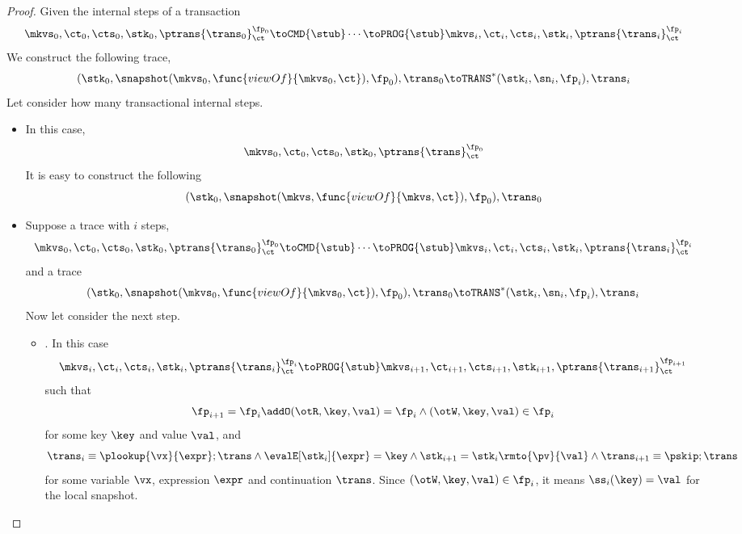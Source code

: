 \begin{proof}
    Given the internal steps of a transaction
    \[
        \mkvs_0, \ct_0, \cts_0, \stk_0, \ptrans{\trans_0}_\ct^{\fp_0} \toCMD{\stub} 
        \cdots  \toPROG{\stub} \mkvs_i, \ct_i, \cts_i, \stk_i, \ptrans{\trans_i}_\ct^{\fp_i}
    \]
    We construct the following trace,
    \[
        (\stk_0, \snapshot(\mkvs_0,\func{viewOf}{\mkvs_0,\ct}), \fp_0), \trans_0 \toTRANS^*
        (\stk_i, \sn_i, \fp_i), \trans_i
    \]
    Let consider how many transactional internal steps.
    \begin{itemize}
        \item {}
        In this case, 
        \[
            \mkvs_0, \ct_0, \cts_0, \stk_0, \ptrans{\trans}_\ct^{\fp_0}
        \]
        It is easy to construct the following
        \[
            (\stk_0, \snapshot(\mkvs,\func{viewOf}{\mkvs,\ct}), \fp_0), \trans_0 
        \]
        \item {}
        Suppose  a trace with \(i\) steps,
        \[
            \mkvs_0, \ct_0, \cts_0, \stk_0, \ptrans{\trans_0}_\ct^{\fp_0} \toCMD{\stub} 
            \cdots  \toPROG{\stub} \mkvs_i, \ct_i, \cts_i, \stk_i, \ptrans{\trans_i}_\ct^{\fp_i}
        \]
        and a trace
        \[
            (\stk_0, \snapshot(\mkvs_0,\func{viewOf}{\mkvs_0,\ct}), \fp_0), \trans_0 \toTRANS^*
            (\stk_i, \sn_i, \fp_i), \trans_i
        \]
        Now let consider the next step.
        \begin{itemize}
            \item {}.
                In this case
                \[
                    \mkvs_i, \ct_i, \cts_i, \stk_i, \ptrans{\trans_i}_\ct^{\fp_i}
                    \toPROG{\stub}
                    \mkvs_{i+1}, \ct_{i+1}, \cts_{i+1}, \stk_{i+1}, \ptrans{\trans_{i+1}}_\ct^{\fp_{i+1}}
                \]
                such that
                \[
                    \fp_{i+1} = \fp_i \addO (\otR, \key, \val)  = \fp_i
                    \land (\otW,\key, \val) \in \fp_i
                \]
                for some key \( \key \) and value \( \val \), and
                \[
                    \trans_{i} \equiv \plookup{\vx}{\expr} ; \trans 
                    \land \evalE[\stk_i]{\expr} = \key 
                    \land \stk_{i+1} = \stk_i\rmto{\pv}{\val}
                    \land  \trans_{i+1} \equiv \pskip ; \trans
                \]
                for some variable \( \vx \), expression \( \expr \) and continuation \( \trans \).
                Since \( ( \otW, \key ,\val ) \in \fp_i  \), it means \( \ss_i(\key) = \val \) for the local snapshot.

\end{itemize}
\end{itemize}
\end{proof}
